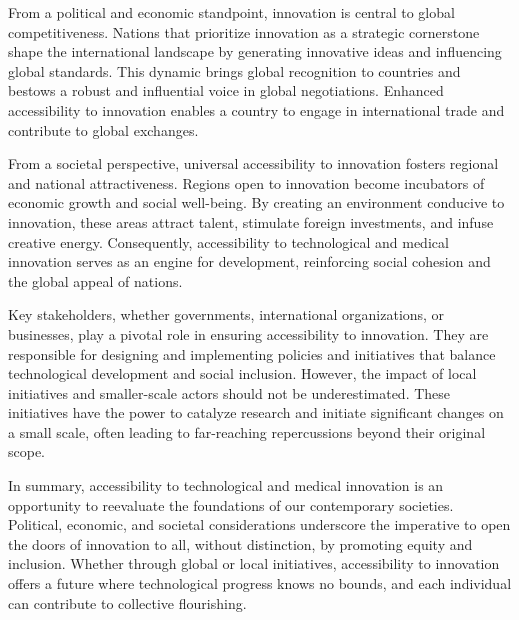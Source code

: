 From a political and economic standpoint, innovation is central to global competitiveness. Nations that prioritize innovation as a strategic cornerstone shape the international landscape by generating innovative ideas and influencing global standards. This dynamic brings global recognition to countries and bestows a robust and influential voice in global negotiations. Enhanced accessibility to innovation enables a country to engage in international trade and contribute to global exchanges.

From a societal perspective, universal accessibility to innovation fosters regional and national attractiveness. Regions open to innovation become incubators of economic growth and social well-being. By creating an environment conducive to innovation, these areas attract talent, stimulate foreign investments, and infuse creative energy. Consequently, accessibility to technological and medical innovation serves as an engine for development, reinforcing social cohesion and the global appeal of nations.

Key stakeholders, whether governments, international organizations, or businesses, play a pivotal role in ensuring accessibility to innovation. They are responsible for designing and implementing policies and initiatives that balance technological development and social inclusion. However, the impact of local initiatives and smaller-scale actors should not be underestimated. These initiatives have the power to catalyze research and initiate significant changes on a small scale, often leading to far-reaching repercussions beyond their original scope.

In summary, accessibility to technological and medical innovation is an opportunity to reevaluate the foundations of our contemporary societies. Political, economic, and societal considerations underscore the imperative to open the doors of innovation to all, without distinction, by promoting equity and inclusion. Whether through global or local initiatives, accessibility to innovation offers a future where technological progress knows no bounds, and each individual can contribute to collective flourishing.